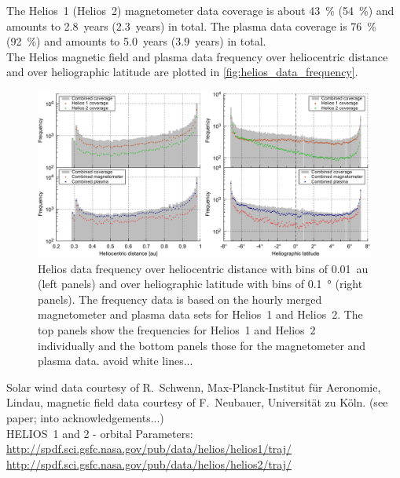 The Helios~1 (Helios~2) magnetometer data coverage is about \SI{43}{\%} (\SI{54}{\%}) and amounts to 2.8~years (2.3~years) in total. The plasma data coverage is \SI{76}{\%} (\SI{92}{\%}) and amounts to 5.0~years (3.9~years) in total.\\


The Helios magnetic field and plasma data frequency over heliocentric distance and over heliographic latitude are plotted in \autoref{fig:helios_data_frequency}.\\
\begin{figure}[htb]
	\centering
	\includegraphics[width=\textwidth]{figures_of_mine/gnuplots/helios_data_frequency.pdf}
	\caption{Helios data frequency over heliocentric distance with bins of \SI{0.01}{au} (left panels) and over heliographic latitude with bins of \SI{0.1}{\degree} (right panels). The frequency data is based on the hourly merged magnetometer and plasma data sets for Helios~1 and Helios~2. The top panels show the frequencies for Helios~1 and Helios~2 individually and the bottom panels those for the magnetometer and plasma data. avoid white lines...}
	\label{fig:helios_data_frequency}
\end{figure}

Solar wind data courtesy of R.~Schwenn, Max-Planck-Institut für Aeronomie, Lindau, magnetic field data courtesy of F.~Neubauer, Universität zu Köln. (see paper; into acknowledgements...)\\




HELIOS~1 and 2 - orbital Parameters:\\
\url{http://spdf.sci.gsfc.nasa.gov/pub/data/helios/helios1/traj/}\\
\url{http://spdf.sci.gsfc.nasa.gov/pub/data/helios/helios2/traj/}\\

